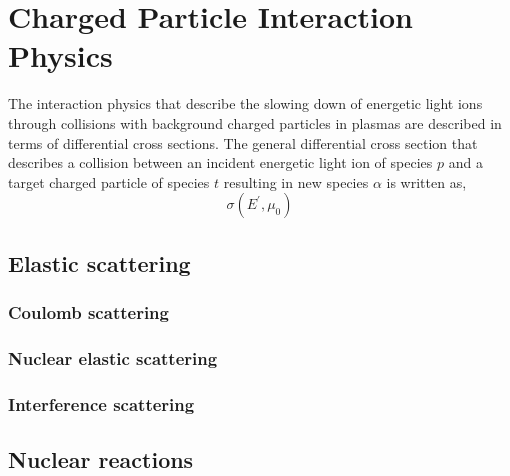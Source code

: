 \chapter{Charged Particle Interaction Physics}
The interaction physics that describe the slowing down of energetic light ions through collisions with background charged particles in plasmas are described in terms of differential cross sections. The general differential cross section that describes a collision between an incident energetic light ion of species $p$ and a target charged particle of species $t$ resulting in
new species $\alpha$ is written as,
\begin{equation}
    \sigma(E^{\prime},\mu_0)
\end{equation}

\section{Elastic scattering}
\subsection{Coulomb scattering}

\subsection{Nuclear elastic scattering}

\subsection{Interference scattering}

\section{Nuclear reactions}


